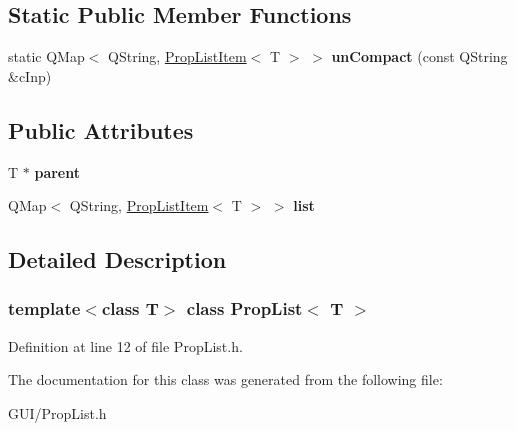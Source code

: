 \subsection*{Static Public Member Functions}
\begin{DoxyCompactItemize}
\item 
\mbox{\label{class_prop_list_a6697f4d4dd41d8c79c7f7748d4f521fb}} 
static Q\+Map$<$ Q\+String, \hyperlink{class_prop_list_item}{Prop\+List\+Item}$<$ T $>$ $>$ {\bfseries un\+Compact} (const Q\+String \&c\+Inp)
\end{DoxyCompactItemize}
\subsection*{Public Attributes}
\begin{DoxyCompactItemize}
\item 
\mbox{\label{class_prop_list_a5115774f050089d6189369c3119f1129}} 
T $\ast$ {\bfseries parent}
\item 
\mbox{\label{class_prop_list_a4cb71baeb21fc07391381b7420c88f5b}} 
Q\+Map$<$ Q\+String, \hyperlink{class_prop_list_item}{Prop\+List\+Item}$<$ T $>$ $>$ {\bfseries list}
\end{DoxyCompactItemize}


\subsection{Detailed Description}
\subsubsection*{template$<$class T$>$\newline
class Prop\+List$<$ T $>$}



Definition at line 12 of file Prop\+List.\+h.



The documentation for this class was generated from the following file\+:\begin{DoxyCompactItemize}
\item 
G\+U\+I/Prop\+List.\+h\end{DoxyCompactItemize}

